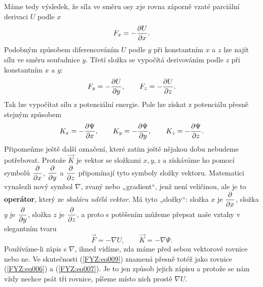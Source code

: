     Máme tedy výsledek, že síla ve směru osy \(x\)je rovna záporně vzaté parciální derivaci \(U\) 
    podle \(x\)
    \begin{equation}\label{FYZ:eq006}
      F_x = -\dfrac{\partial U}{\partial x}.
    \end{equation}
    Podobným způsobem diferencováním \(U\) podle \(y\) při konstantním \(x\) a \(z\) lze najít sílu 
    ve směru souřadnice \(y\). Třetí složka se vypočítá derivováním podle \(z\) při konstantním 
    \(x\) a \(y\):
    \begin{equation}\label{FYZ:eq007}
      F_y = -\dfrac{\partial U}{\partial y}, \qquad  F_z = -\dfrac{\partial U}{\partial z}.
    \end{equation}
    Tak lze vypočítat sílu z potenciální energie. Pole lze získat z potenciálu přesně stejným 
    způsobem
    \begin{equation}\label{fyz:eq008}
      K_x = - \dfrac{\partial \Psi}{\partial x},\qquad K_y = - \dfrac{\partial \Psi}{\partial y},\qquad K_z = - \dfrac{\partial \Psi}{\partial z}.
    \end{equation}
    Připomeňme ještě další označení, které zatím ještě nějakou dobu nebudeme potřebovat. Protože 
    \(\vec{K}\) je vektor se složkami \(x, y, z\) a získáváme ho pomocí symbolů \(\dfrac{\partial  }{\partial x}\), 
    \(\dfrac{\partial  }{\partial y}\) a \(\dfrac{\partial  }{\partial z}\) připomínají tyto symboly složky vektoru. Matematici vynalezli 
    nový symbol \(\nabla\), zvaný  nebo „gradient“, jenž není veličinou, ale je to 
    \textbf{operátor}, který ze \emph{skaláru udělá vektor}. Má tyto „složky“: složka \(x\) je 
    \(\dfrac{\partial  }{\partial x}\), složka \(y\) je \(\dfrac{\partial  }{\partial y}\), složka \(z\) je \(\dfrac{\partial  }{\partial z}\), a proto s 
    potěšením můžeme přepsat naše vztahy v elegantním tvaru
    \begin{equation}\label{FYZ:eq009}
      \vec{F} = -\nabla U, \qquad  \vec{K} = -\nabla\Psi.
    \end{equation}
    Používáme-li zápis s \(\nabla\), ihned vidíme, zda máme před sebou vektorové rovnice nebo ne. 
    Ve skutečnosti (\ref{FYZ:eq009}) znamená přesně totéž jako rovnice (\ref{FYZ:eq006}) a 
    (\ref{FYZ:eq007}). Je to jen způsob jejich zápisu a protože se nám vždy nechce psát tři 
    rovnice, píšeme místo nich prostě \(\nabla U\).
    
